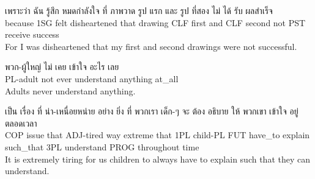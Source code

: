 \documentclass{book}
\begin{document}
	\begin{exe}
		\ex
		\gll เพราะว่า ฉัน รู้สึก หมดกำลังใจ ที่ ภาพวาด รูป แรก และ รูป ที่สอง ไม่ ได้ รับ ผลสำเร็จ\\
		because \textsc{1SG} felt disheartened that drawing \textsc{CLF} first and \textsc{CLF} second not \textsc{PST} receive success\\
		For I was disheartened that my first and second drawings were not successful.
	\end{exe}

	\begin{exe}
		\ex
		\gll พวก-ผู้ใหญ่ ไม่ เคย เข้าใจ อะไร เลย\\
		\textsc{PL}-adult not ever understand anything at\_all\\
		Adults never understand anything.
	\end{exe}

	\begin{exe}
		\ex
		\gll เป็น เรื่อง ที่ น่า-เหนื่อยหน่าย อย่าง ยิ่ง ที่ พวกเรา เด็ก-ๆ จะ ต้อง อธิบาย ให้ พวกเขา เข้าใจ อยู่ ตลอดเวลา\\
		\textsc{COP} issue that \textsc{ADJ}-tired way extreme that \textsc{1PL} child-\textsc{PL} \textsc{FUT} have\_to explain such\_that \textsc{3PL} understand \textsc{PROG} throughout time\\
		It is extremely tiring for us children to always have to explain such that they can understand.
	\end{exe}
\end{document}
